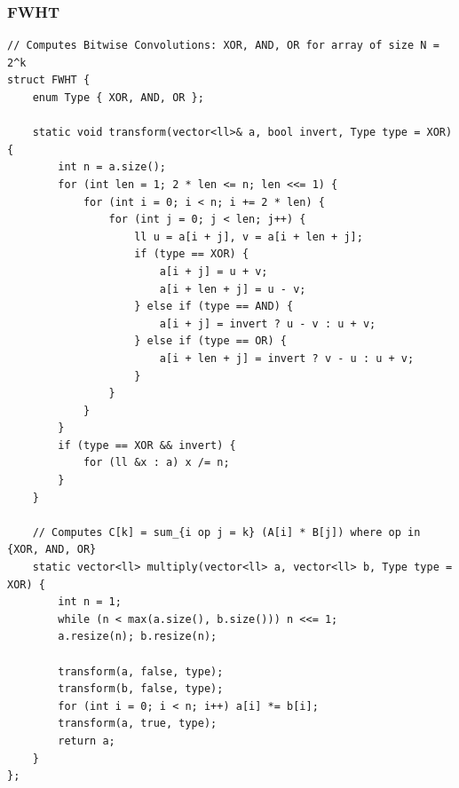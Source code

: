\documentclass[9pt,a4paper,twocolumn]{extarticle}
\begin{document}
\filbreak
\subsubsection{FWHT}
\nopagebreak
\begin{lstlisting}
// Computes Bitwise Convolutions: XOR, AND, OR for array of size N = 2^k
struct FWHT {
    enum Type { XOR, AND, OR };

    static void transform(vector<ll>& a, bool invert, Type type = XOR) {
        int n = a.size();
        for (int len = 1; 2 * len <= n; len <<= 1) {
            for (int i = 0; i < n; i += 2 * len) {
                for (int j = 0; j < len; j++) {
                    ll u = a[i + j], v = a[i + len + j];
                    if (type == XOR) {
                        a[i + j] = u + v;
                        a[i + len + j] = u - v;
                    } else if (type == AND) {
                        a[i + j] = invert ? u - v : u + v;
                    } else if (type == OR) {
                        a[i + len + j] = invert ? v - u : u + v;
                    }
                }
            }
        }
        if (type == XOR && invert) {
            for (ll &x : a) x /= n;
        }
    }

    // Computes C[k] = sum_{i op j = k} (A[i] * B[j]) where op in {XOR, AND, OR}
    static vector<ll> multiply(vector<ll> a, vector<ll> b, Type type = XOR) {
        int n = 1;
        while (n < max(a.size(), b.size())) n <<= 1;
        a.resize(n); b.resize(n);

        transform(a, false, type);
        transform(b, false, type);
        for (int i = 0; i < n; i++) a[i] *= b[i];
        transform(a, true, type);
        return a;
    }
};
\end{lstlisting}

\filbreak
\end{document}
